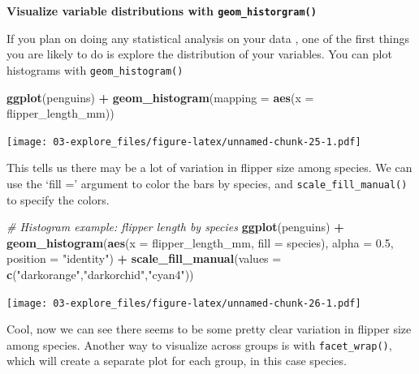 \documentclass[
]{book}
\newenvironment{Shaded}{\begin{snugshade}}{\end{snugshade}}
\newcommand{\AttributeTok}[1]{\textcolor[rgb]{0.13,0.29,0.53}{#1}}
\newcommand{\CommentTok}[1]{\textcolor[rgb]{0.56,0.35,0.01}{\textit{#1}}}
\newcommand{\FloatTok}[1]{\textcolor[rgb]{0.00,0.00,0.81}{#1}}
\newcommand{\FunctionTok}[1]{\textcolor[rgb]{0.13,0.29,0.53}{\textbf{#1}}}
\newcommand{\NormalTok}[1]{#1}
\newcommand{\SpecialCharTok}[1]{\textcolor[rgb]{0.81,0.36,0.00}{\textbf{#1}}}
\newcommand{\StringTok}[1]{\textcolor[rgb]{0.31,0.60,0.02}{#1}}
\begin{document}
\textbf{Visualize variable distributions with \texttt{geom\_historgram()}}

If you plan on doing any statistical analysis on your data , one of the first things you are likely to do is explore the distribution of your variables. You can plot histograms with \texttt{geom\_histogram()}

\begin{Shaded}
\begin{Highlighting}[]
\FunctionTok{ggplot}\NormalTok{(penguins) }\SpecialCharTok{+} 
  \FunctionTok{geom\_histogram}\NormalTok{(}\AttributeTok{mapping =} \FunctionTok{aes}\NormalTok{(}\AttributeTok{x =}\NormalTok{ flipper\_length\_mm))}
\end{Highlighting}
\end{Shaded}

\texttt{[image: 03-explore\_files/figure-latex/unnamed-chunk-25-1.pdf]}

This tells us there may be a lot of variation in flipper size among species. We can use the `fill =' argument to color the bars by species, and \texttt{scale\_fill\_manual()} to specify the colors.

\begin{Shaded}
\begin{Highlighting}[]
\CommentTok{\# Histogram example: flipper length by species}
\FunctionTok{ggplot}\NormalTok{(penguins) }\SpecialCharTok{+}
  \FunctionTok{geom\_histogram}\NormalTok{(}\FunctionTok{aes}\NormalTok{(}\AttributeTok{x =}\NormalTok{ flipper\_length\_mm, }\AttributeTok{fill =}\NormalTok{ species), }\AttributeTok{alpha =} \FloatTok{0.5}\NormalTok{, }\AttributeTok{position =} \StringTok{"identity"}\NormalTok{) }\SpecialCharTok{+}
  \FunctionTok{scale\_fill\_manual}\NormalTok{(}\AttributeTok{values =} \FunctionTok{c}\NormalTok{(}\StringTok{"darkorange"}\NormalTok{,}\StringTok{"darkorchid"}\NormalTok{,}\StringTok{"cyan4"}\NormalTok{))}
\end{Highlighting}
\end{Shaded}

\texttt{[image: 03-explore\_files/figure-latex/unnamed-chunk-26-1.pdf]}

Cool, now we can see there seems to be some pretty clear variation in flipper size among species. Another way to visualize across groups is with \texttt{facet\_wrap()}, which will create a separate plot for each group, in this case species.
\end{document}
